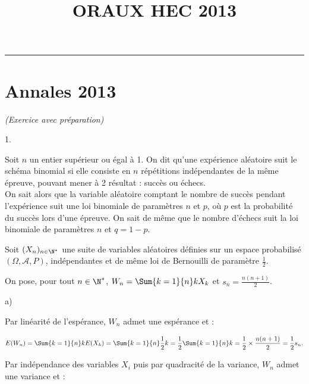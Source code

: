 \documentclass[11pt]{article}%
\title{\bf \vspace{-1cm} ORAUX HEC 2013} %
\author{} %
\date{} %
\begin{document}
\maketitle %
\vspace{-1.2cm}\hrule %
\thispagestyle{fancy}

\vspace*{.4cm}


\section{Annales 2013}

\begin{exercice}{\it (Exercice avec préparation)}~
 \begin{noliste}{1.}
 \setlength{\itemsep}{4mm}
 \item Soit $n$ un entier supérieur ou égal à 1. On dit qu'une
 expérience aléatoire suit le schéma binomial si elle consiste en
 $n$ répétitions indépendantes de la même épreuve, pouvant mener à
 2 résultat : succès ou échecs.\\
 On sait alors que la variable aléatoire comptant le nombre de
 succès pendant l'expérience suit une loi binomiale de paramètres
 $n$ et $p$, où $p$ est la probabilité du succès lors d'une
 épreuve. On sait de même que le nombre d'échecs suit la loi
 binomiale de paramètres $n$ et $q = 1-p$.
 
 \item Soit $(X_{n})_{ n \in \N^* }$ une suite de variables aléatoires
 définies sur un espace probabilisé $(\Omega, \mathcal{A}, P )$,
 indépendantes et de même loi de Bernouilli de paramètre
 $\frac{1}{2}$.
 
 On pose, pour tout $n \in \N^*$, $W_{n} = \Sum{k = 1}{n} k X_{k}$ et
 $s_{n} = \frac{ n ( n + 1 ) }{ 2 }$.
 
 \begin{noliste}{a)}
 \setlength{\itemsep}{2mm}

 \item Par linéarité de l'espérance, $W_{n}$ admet une espérance et :
 
\[
 E ( W_{n} ) = \Sum{k = 1}{n} k E ( X_{k} ) = \Sum{k = 1}{n} \frac{ 1
}{
 2 } k = \frac{ 1 }{ 2} \Sum{k = 1}{n} k = \frac{ 1 }{ 2} \times
 \frac{ n (n + 1 ) }{ 2 } = \frac{ 1 }{ 2 } s_{n}.
\]
 
 Par indépendance des variables $X_{i}$ puis par quadracité de la
 variance, $W_{n}$ admet une variance et :
 

\end{noliste}
\end{noliste}
\end{exercice}
\end{document}
